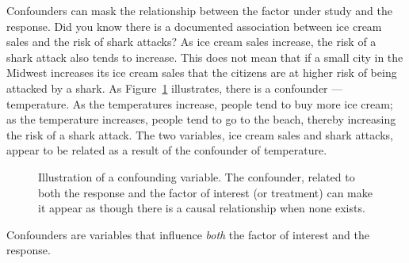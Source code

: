 \documentclass[
  letterpaper,
  DIV=11,
  numbers=noendperiod]{scrreprt}
\theoremstyle{plain}
\theoremstyle{definition}
\theoremstyle{definition}
\theoremstyle{remark}
\begin{document}
Confounders can mask the relationship between the factor under study and
the response. Did you know there is a documented association between ice
cream sales and the risk of shark attacks? As ice cream sales increase,
the risk of a shark attack also tends to increase. This does not mean
that if a small city in the Midwest increases its ice cream sales that
the citizens are at higher risk of being attacked by a shark. As
Figure~\ref{fig-data-confounding} illustrates, there is a confounder ---
temperature. As the temperatures increase, people tend to buy more ice
cream; as the temperature increases, people tend to go to the beach,
thereby increasing the risk of a shark attack. The two variables, ice
cream sales and shark attacks, appear to be related as a result of the
confounder of temperature.

\begin{figure}


\caption{\label{fig-data-confounding}Illustration of a confounding
variable. The confounder, related to both the response and the factor of
interest (or treatment) can make it appear as though there is a causal
relationship when none exists.}

\end{figure}%

\begin{tcolorbox}[enhanced jigsaw, breakable, titlerule=0mm, colframe=quarto-callout-tip-color-frame, bottomtitle=1mm, opacityback=0, rightrule=.15mm, toptitle=1mm, arc=.35mm, bottomrule=.15mm, left=2mm, title=\textcolor{quarto-callout-tip-color}{\faLightbulb}\hspace{0.5em}{Big Idea}, leftrule=.75mm, coltitle=black, toprule=.15mm, colbacktitle=quarto-callout-tip-color!10!white, colback=white, opacitybacktitle=0.6]

Confounders are variables that influence \emph{both} the factor of
interest and the response.

\end{tcolorbox}
\end{document}
